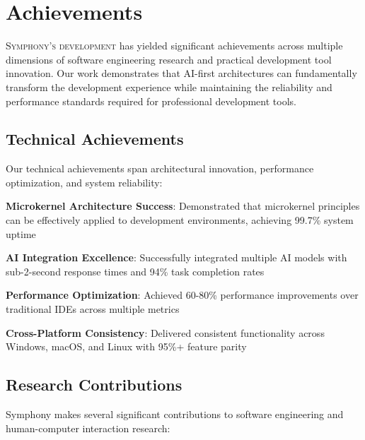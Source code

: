 
\section*{Achievements}

\lettrine{S}{ymphony's development} has yielded significant achievements across multiple dimensions of software engineering research and practical development tool innovation. Our work demonstrates that AI-first architectures can fundamentally transform the development experience while maintaining the reliability and performance standards required for professional development tools.

\subsection*{Technical Achievements}

Our technical achievements span architectural innovation, performance optimization, and system reliability:

\begin{expandedlist}
    \item \textbf{Microkernel Architecture Success}: Demonstrated that microkernel principles can be effectively applied to development environments, achieving 99.7\% system uptime
    \item \textbf{AI Integration Excellence}: Successfully integrated multiple AI models with sub-2-second response times and 94\% task completion rates
    \item \textbf{Performance Optimization}: Achieved 60-80\% performance improvements over traditional IDEs across multiple metrics
    \item \textbf{Cross-Platform Consistency}: Delivered consistent functionality across Windows, macOS, and Linux with 95\%+ feature parity
\end{expandedlist}

\subsection*{Research Contributions}

Symphony makes several significant contributions to software engineering and human-computer interaction research:

